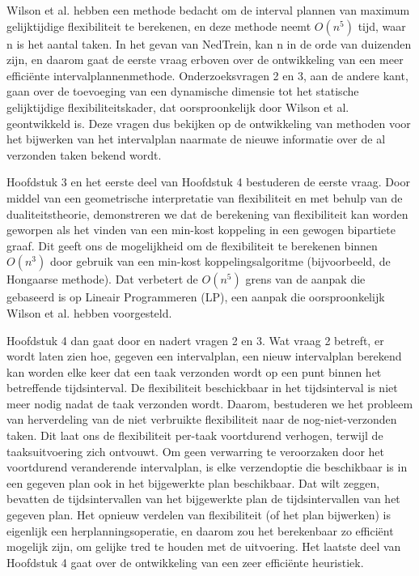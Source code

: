 Wilson et al. hebben een methode bedacht om de interval plannen van maximum gelijktijdige flexibiliteit te berekenen, 
en deze methode neemt $O(n^5)$ tijd, waar n is het aantal taken. 
In het gevan van NedTrein, kan n in de orde van duizenden zijn, 
en daarom gaat de eerste vraag erboven over de ontwikkeling van een meer efficiënte intervalplannenmethode. 
Onderzoeksvragen 2 en 3, aan de andere kant, gaan over de toevoeging van een dynamische dimensie tot het statische gelijktijdige flexibiliteitskader, 
dat oorsproonkelijk door Wilson et al. geontwikkeld is. 
Deze vragen dus bekijken op de ontwikkeling van methoden voor het bijwerken van het intervalplan naarmate de nieuwe informatie over de al verzonden taken bekend wordt.

Hoofdstuk 3 en het eerste deel van Hoofdstuk 4 bestuderen de eerste vraag. 
Door middel van een geometrische interpretatie van flexibiliteit en met behulp van de dualiteitstheorie, 
demonstreren we dat de berekening van flexibiliteit kan worden geworpen als het vinden van een min-kost koppeling in een gewogen bipartiete graaf. 
Dit geeft ons de mogelijkheid om de flexibiliteit te berekenen binnen $O(n^3)$ door gebruik van een min-kost koppelingsalgoritme (bijvoorbeeld, de Hongaarse methode). 
Dat verbetert de $O(n^5)$ grens van de aanpak die gebaseerd is op Lineair Programmeren (LP), een aanpak die oorsproonkelijk Wilson et al. hebben voorgesteld.

Hoofdstuk 4 dan gaat door en nadert vragen 2 en 3. 
Wat vraag 2 betreft, er wordt laten zien hoe, gegeven een intervalplan, een nieuw intervalplan berekend kan worden elke keer dat een taak verzonden wordt op een punt binnen het betreffende tijdsinterval. 
De flexibiliteit beschickbaar in het tijdsinterval is niet meer nodig nadat de taak verzonden wordt. 
Daarom, bestuderen we het probleem van herverdeling van de niet verbruikte flexibiliteit naar de nog-niet-verzonden taken. 
Dit laat ons de flexibiliteit per-taak voortdurend verhogen, 
terwijl de taaksuitvoering zich ontvouwt. Om geen verwarring te veroorzaken door het voortdurend veranderende intervalplan, 
is elke verzendoptie die beschikbaar is in een gegeven plan ook in het bijgewerkte plan beschikbaar. 
Dat wilt zeggen, bevatten de tijdsintervallen van het bijgewerkte plan de tijdsintervallen van het gegeven plan. 
Het opnieuw verdelen van flexibiliteit (of het plan bijwerken) is eigenlijk een herplanningsoperatie, 
en daarom zou het berekenbaar zo efficiënt mogelijk zijn, 
om gelijke tred te houden met de uitvoering. 
Het laatste deel van Hoofdstuk 4 gaat over de ontwikkeling van een zeer efficiënte heuristiek.

